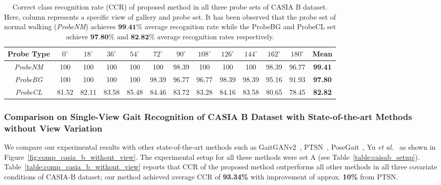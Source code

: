 \begin{table}[t]
	\caption{Correct class recognition rate (CCR) of proposed method in all three probe sets of CASIA B dataset. Here, column represents a specific view of gallery and probe set.  It has been observed that the probe set of normal walking (\textit{ProbeNM}) achieves $ \textbf{99.41\%}$ average recognition rate while the ProbeBG and ProbeCL set achieve $ \textbf{97.80\%}$ and $\textbf{82.82\%}$ average recognition rates respectively. \label{table:resutl_without_view}}
	{\begin{tabular*}{\textwidth}{@{\extracolsep{\fill}}ccccccccccccc}\hline
			Probe Type &${0^{\circ}}$	&${18^{\circ}}$ &${36^{\circ}}$	&${54^{\circ}}$	&${72^{\circ}}$	&${90^{\circ}}$	
			&${108^{\circ}}$ &${126^{\circ}}$ &${144^{\circ}}$ &${162^{\circ}}$	&${180^{\circ}}$ & Mean \\
			\hline
			\textit{ProbeNM} &100  &100  &100  &100  &100  &98.39  &100  &100  &100  &98.39  &96.77  &\textbf{99.41} \\
			\rule{0pt}{2ex}\textit{ProbeBG}	&100 &100 &100 &100 &98.39 &96.77 &96.77 &98.39 &98.39 &95.16 &91.93 &\textbf{97.80} \\
			
			\rule{0pt}{2ex}\textit{ProbeCL} &81.52 &82.11 &83.58 &85.48 &84.46 &83.72 &83.28 &84.16 &83.58 &80.65 &78.45 &\textbf{82.82} \\
			\hline
	\end{tabular*}}{}
\end{table}



\subsubsection{Comparison on Single-View Gait Recognition of CASIA B Dataset with State-of-the-art Methods without View Variation}
We compare our experimental results with other state-of-the-art methods such as GaitGANv2~\cite{Yu_19}, PTSN~\cite{Liao_17}, PoseGait~\cite{Liao_19}, Yu \textit{et al.}~\cite{Yu_17_spae} as shown in Figure~\ref{fig:comp_casia_b_without_view}. The experimental setup for all these methods were set A (see Table~\ref{table:caisab_setup}). Table~\ref{table:comp_casia_b_without_view} reports that CCR of the proposed method outperforms all other methods in all three covariate conditions of CASIA-B dataset; our method achieved average CCR of \textbf{93.34\%} with improvement of approx. \textbf{10\%} from PTSN.



